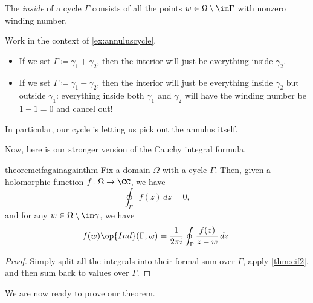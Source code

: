 \begin{definition}[Inside]
	The \textit{inside} of a cycle $\Gamma$ consists of all the points $w\in\Omega\setminus\im\Gamma$ with nonzero winding number.
\end{definition}
\begin{example} \label{ex:insideannulus}
	Work in the context of \autoref{ex:annuluscycle}.
	\begin{itemize}
		\item If we set $\Gamma\coloneqq\gamma_1+\gamma_2$, then the interior will just be everything inside $\gamma_2$.
		\item If we set $\Gamma\coloneqq\gamma_1-\gamma_2$, then the interior will just be everything inside $\gamma_2$ but outside $\gamma_1$: everything inside both $\gamma_1$ and $\gamma_2$ will have the winding number be $1-1=0$ and cancel out!
	\end{itemize}
	In particular, our cycle is letting us pick out the annulus itself.
\end{example}
Now, here is our stronger version of the Cauchy integral formula.
\begin{restatable}{theorem}{cifagainagainthm} \label{thm:cif3}
	Fix a domain $\Omega$ with a cycle $\Gamma$. Then, given a holomorphic function $f\colon\Omega\to\CC$, we have
	\[\oint_\Gamma f(z)\,dz=0,\]
	and for any $w\in\Omega\setminus\im\gamma$, we have
	\[f(w)\op{Ind}(\Gamma,w)=\frac1{2\pi i}\oint_\Gamma\frac{f(z)}{z-w}\,dz.\]
\end{restatable}
\begin{proof}
	Simply split all the integrals into their formal sum over $\Gamma$, apply \autoref{thm:cif2}, and then sum back to values over $\Gamma$.
\end{proof}
We are now ready to prove our theorem.
